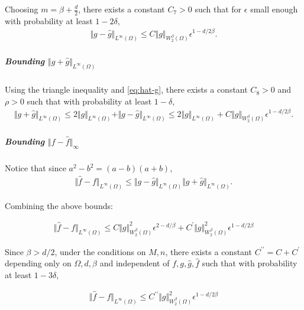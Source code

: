 Choosing $m = \beta + \frac{d}{2}$, there exists a constant $C_7>0$  such that for $\epsilon$ small enough with probability at least $1 - 2\delta$,
\begin{align}
    \Vert g - \hat g\Vert_{L^{\infty}(\Omega)}\leq C\Vert g\Vert_{W^\beta_2(\Omega)}\epsilon^{1- d/2\beta}.
\end{align}

\subparagraph{Bounding $\Vert g+ \hat g\Vert_{L^\infty(\Omega)}$}
Using the triangle inequality and \cref{eq:hat-g}, there exists a constant $C_8>0$ and $\rho > 0$ such that with probability at least $1- \delta$,
\begin{align}
    \Vert g +\hat g\Vert_{L^\infty(\Omega)} \leq 2\Vert g\Vert_{L^\infty(\Omega)} + \Vert g-\hat g\Vert_{L^\infty(\Omega)} \leq 2\Vert g\Vert_{L^\infty(\Omega)} + C\Vert g\Vert_{W^\beta_2(\Omega)}\epsilon^{1- d/2\beta}.
\end{align}

\subparagraph{Bounding $\Vert f - \hat f\Vert_\infty$}
Notice that since $a^2 - b^2 = (a-b)(a+b)$,
\begin{align}
    \Vert \hat f - f \Vert_{L^\infty(\Omega)} \leq \Vert g - \hat g\Vert_{L^\infty(\Omega)} \Vert g +\hat g\Vert_{L^\infty(\Omega)}.
\end{align}

Combining the above bounds:

\begin{align}
    \Vert \hat f - f \Vert_{L^\infty(\Omega)} \leq C\Vert g\Vert^2_{W^\beta_2(\Omega)}\epsilon^{2- d/\beta} + C^\prime \Vert g\Vert^2_{W^\beta_2(\Omega)}\epsilon^{1 - d/2\beta}
\end{align}

Since $\beta > d/2$, under the conditions on $M, n$, there exists a constant $C^{\prime\prime}= C + C^\prime$ depending only on $\Omega, d, \beta$ and independent of $f, g,\hat g, \hat f$ such that with probability at least $1-3\delta$,

\begin{align}
    \Vert \hat f - f \Vert_{L^\infty(\Omega)} \leq C^{\prime\prime}\Vert g\Vert^2_{W^\beta_2(\Omega)} \epsilon^{1 - d/2\beta}
\end{align}
